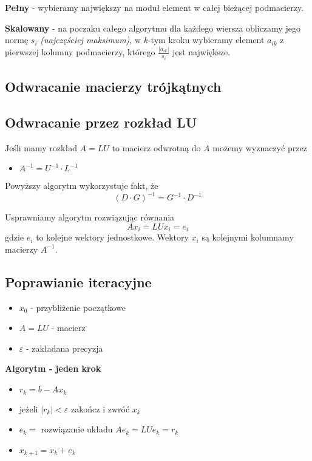 \documentclass[../mn-notatki.tex]{subfiles}
\begin{document}
\begin{tcolorbox}
\textbf{Pełny} - wybieramy największy na moduł element w całej
bieżącej podmacierzy.
\end{tcolorbox}

\begin{tcolorbox}
\textbf{Skalowany} - na poczaku całego algorytmu dla każdego wiersza obliczamy
jego normę $s_i$ \textit{(najczęściej maksimum)}, w $k$-tym kroku wybieramy
element $a_{ik}$ z pierwszej kolumny podmacierzy, którego
$\frac{|a_{ik}|}{s_i}$ jest największe.
\end{tcolorbox}

\subsection{Odwracanie macierzy trójkątnych}
\subsection{Odwracanie przez rozkład LU}

\begin{tcolorbox}
Jeśli mamy rozkład $A = LU$ to macierz odwrotną do $A$ możemy wyznaczyć przez
\begin{itemize}
    \item $A^{-1} = U^{-1} \cdot L^{-1}$
\end{itemize}
Powyższy algorytm wykorzystuje fakt, że
\[
(D\cdot G)^{-1} = G^{-1} \cdot D^{-1}
\]
\end{tcolorbox}

Usprawniamy algorytm rozwiązując równania
\[
Ax_i = LUx_i = e_i
\]
gdzie $e_i$ to kolejne wektory jednostkowe. Wektory $x_i$ są kolejnymi
kolumnamy macierzy $A^{-1}$.

\subsection{Poprawianie iteracyjne}

\begin{itemize}
    \item $x_0$ - przybliżenie początkowe
    \item $A = LU$ - macierz
    \item $\varepsilon$ - zakładana precyzja
\end{itemize}
\begin{tcolorbox}
\textbf{Algorytm - jeden krok}
\begin{itemize}
    \item $r_k = b - Ax_k$
    \item jeżeli $|r_k| < \varepsilon$ zakończ i zwróć $x_k$
    \item $e_k = $ rozwiązanie układu $Ae_k = LUe_k = r_k$
    \item $x_{k+1} = x_k + e_k$
\end{itemize}
\end{tcolorbox}
\end{document}
